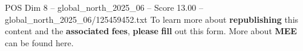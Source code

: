 \begin{textsample}{POS Dim 8 – global\_north\_2025\_06 – Score 13.00 – global\_north\_2025\_06/125459452.txt}
To learn more about \textbf{republishing} this content and the \textbf{associated} \textbf{fees}, \textbf{please} \textbf{fill} out this form.
More about \textbf{MEE} can be found here.

\end{textsample}
